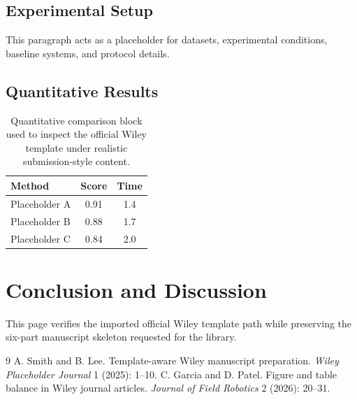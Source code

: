 \documentclass[MPS,twocolumn]{USG}
\begin{document}
\subsection{Experimental Setup}
This paragraph acts as a placeholder for datasets, experimental conditions, baseline systems, and protocol details.
\subsection{Quantitative Results}
\begin{table}[htb]
\caption{Quantitative comparison block used to inspect the official Wiley template under realistic submission-style content.}
\begin{tabular}{lcc}
\toprule
Method & Score & Time \\
\midrule
Placeholder A & 0.91 & 1.4 \\
Placeholder B & 0.88 & 1.7 \\
Placeholder C & 0.84 & 2.0 \\
\bottomrule
\end{tabular}
\end{table}
\section{Conclusion and Discussion}
This page verifies the imported official Wiley template path while preserving the six-part manuscript skeleton requested for the library.
\begin{thebibliography}{9}
 A. Smith and B. Lee. Template-aware Wiley manuscript preparation. \textit{Wiley Placeholder Journal} 1 (2025): 1--10.
 C. Garcia and D. Patel. Figure and table balance in Wiley journal articles. \textit{Journal of Field Robotics} 2 (2026): 20--31.
\end{thebibliography}
\end{document}
